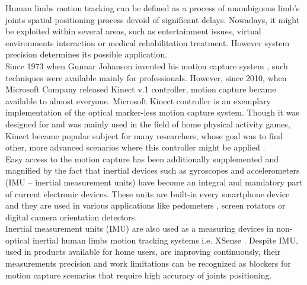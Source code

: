 \documentclass[sensors,article,submit,moreauthors,pdftex,10pt,a4paper]{mdpi}
\begin{document}
Human limbs motion tracking can be defined as a process of unambiguous limb’s joints spatial positioning process devoid of significant delays. Nowadays, it might be exploited within several areas, such as entertainment issues, virtual environments interaction or medical rehabilitation treatment. However system precision determines its possible application. \\
Since 1973 when Gunnar Johanson invented his motion capture system \cite{Johansson1973}, such techniques were available mainly for professionals. However, since 2010, when Microsoft Company released Kinect v.1 controller, motion capture became available to almost everyone. Microsoft Kinect controller is an exemplary implementation of the optical marker-less motion capture system. Though it was designed for and was mainly used in the field of home physical activity games, Kinect became popular subject for many researchers, whose goal was to find other, more advanced scenarios where this controller might be applied \cite{Lange2012, Chang2011}.\\
Easy access to the motion capture has been additionally supplemented and magnified by the fact that inertial devices such as gyroscopes and accelerometers (IMU – inertial measurement units) have become an integral and mandatory part of current electronic devices. These units are built-in every smartphone device and they are used in various applications like pedometers \cite{Huang2012,Jayalath2013}, screen rotators \cite{Pedley2013} or digital camera orientation detectors.\\
Inertial measurement units (IMU) are also used as a measuring devices in non-optical inertial human limbs motion tracking systems i.e. XSense \cite{XsensCorp}. Despite IMU, used in products available for home users, are improving continuously, their measurements precision and work limitations can be recognized as blockers for motion capture scenarios that require high accuracy of joints positioning.\\%
\end{document}
